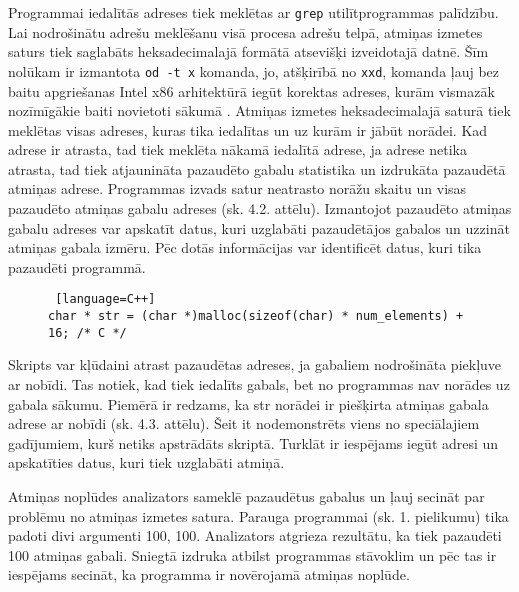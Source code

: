 Programmai iedalītās adreses tiek meklētas ar \texttt{grep} utilītprogrammas palīdzību.
Lai nodrošinātu adrešu meklēšanu visā procesa adrešu telpā, atmiņas izmetes saturs tiek saglabāts heksadecimalajā formātā atsevišķi izveidotajā datnē.
Šīm nolūkam ir izmantota \texttt{od -t x} komanda, jo, atšķirībā no \texttt{xxd}, komanda ļauj bez baitu apgriešanas Intel x86 arhitektūrā iegūt korektas adreses, kurām  vismazāk nozīmīgākie baiti novietoti sākumā \cite{DPT}.
Atmiņas izmetes heksadecimalajā saturā tiek meklētas visas adreses, kuras tika iedalītas un uz kurām ir jābūt norādei.
Kad adrese ir atrasta, tad tiek meklēta nākamā iedalītā adrese, ja adrese netika atrasta, tad tiek atjaunināta pazaudēto gabalu statistika un izdrukāta pazaudētā atmiņas adrese.
Programmas izvads satur neatrasto norāžu skaitu un visas pazaudēto atmiņas gabalu adreses (sk. 4.2. attēlu).
Izmantojot pazaudēto atmiņas gabalu adreses var apskatīt datus, kuri uzglabāti pazaudētājos gabalos un uzzināt atmiņas gabala izmēru.
Pēc dotās informācijas var identificēt datus, kuri tika pazaudēti programmā.


\begin{figure}[h]
\begin{lstlisting} [language=C++]
char * str = (char *)malloc(sizeof(char) * num_elements) + 16; /* C */
\end{lstlisting}
\caption{\textbf{\fontsize{11}{12}\selectfont {Speciālgadījums - procesa adrešu telpā nav norādes uz gabala sākumu}}}
\end{figure}


Skripts var kļūdaini atrast pazaudētas adreses, ja gabaliem nodrošināta piekļuve ar nobīdi.
Tas notiek, kad tiek iedalīts gabals, bet no programmas nav norādes uz gabala sākumu.
Piemērā ir redzams, ka str norādei ir piešķirta atmiņas gabala adrese ar nobīdi (sk. 4.3. attēlu).
Šeit it nodemonstrēts viens no speciālajiem gadījumiem, kurš netiks apstrādāts skriptā. 
Turklāt ir iespējams iegūt adresi un apskatīties datus, kuri tiek uzglabāti atmiņā.



Atmiņas noplūdes analizators sameklē pazaudētus gabalus un ļauj secināt par problēmu no atmiņas izmetes satura.
Parauga programmai (sk. 1. pielikumu) tika padoti divi argumenti 100, 100. 
Analizators atgrieza rezultātu, ka tiek pazaudēti 100 atmiņas gabali.
Sniegtā izdruka atbilst programmas stāvoklim un pēc tas ir iespējams secināt, ka programma ir novērojamā atmiņas noplūde.


